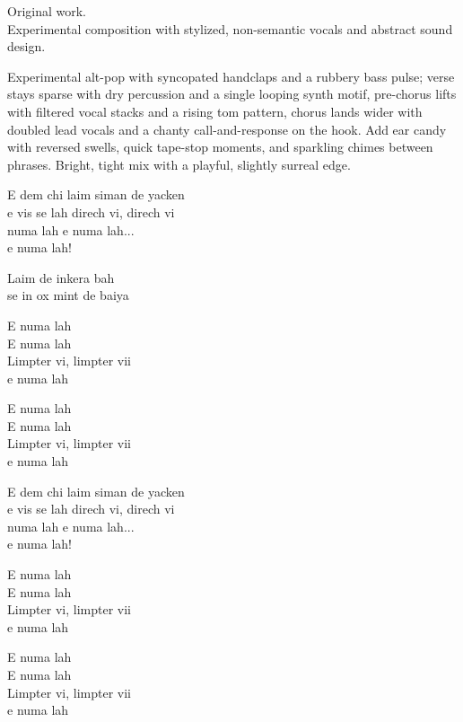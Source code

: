 

\begin{notes}
Original work.\\
Experimental composition with stylized, non-semantic vocals and abstract sound design.
\end{notes}

\begin{style}
Experimental alt-pop with syncopated handclaps and a rubbery bass pulse; verse stays sparse with dry percussion and a single looping synth motif, pre-chorus lifts with filtered vocal stacks and a rising tom pattern, chorus lands wider with doubled lead vocals and a chanty call-and-response on the hook. %
Add ear candy with reversed swells, quick tape-stop moments, and sparkling chimes between phrases. %
Bright, tight mix with a playful, slightly surreal edge.
\end{style}

\begin{lyrics}
E dem chi laim siman de yacken\\
e vis se lah direch vi, direch vi\\
numa lah e numa lah...\\
e numa lah!

Laim de inkera bah\\
se in ox mint de baiya

E numa lah\\
E numa lah\\
Limpter vi, limpter vii\\
e numa lah

E numa lah\\
E numa lah\\
Limpter vi, limpter vii\\
e numa lah

E dem chi laim siman de yacken\\
e vis se lah direch vi, direch vi\\
numa lah e numa lah...\\
e numa lah!

E numa lah\\
E numa lah\\
Limpter vi, limpter vii\\
e numa lah

E numa lah\\
E numa lah\\
Limpter vi, limpter vii\\
e numa lah
\end{lyrics}


